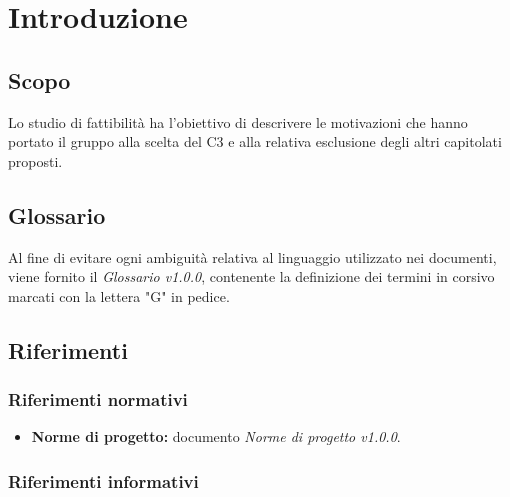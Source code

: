 \documentclass[openany,12pt,a4paper]{report}
\begin{document}

	\tableofcontents


	\chapter{Introduzione}

	\section{Scopo}

	Lo studio di fattibilità ha l’obiettivo di descrivere le motivazioni che hanno portato
	il gruppo alla scelta del  C3 e alla relativa esclusione degli altri capitolati proposti.

	\section{Glossario}

	Al fine di evitare ogni ambiguità relativa al linguaggio utilizzato nei documenti, viene fornito il \textit{Glossario v1.0.0}, contenente la definizione dei termini in corsivo marcati con la lettera "G" in pedice.

	\section{Riferimenti}

	\subsection{Riferimenti normativi}

	\begin{itemize}

		\item \textbf{Norme di progetto:} documento \textit{Norme di progetto v1.0.0}.

	\end{itemize}

	\subsection{Riferimenti informativi}
\end{document}
